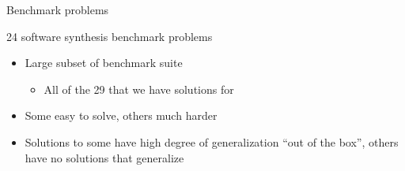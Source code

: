 \documentclass{beamer}
\begin{document}
\begin{frame}{Benchmark problems}

24 software synthesis benchmark problems
\begin{itemize}
	\item Large subset of benchmark suite~\cite{Helmuth:2015:GECCO}
	\begin{itemize}
		\item All of the 29 that we have solutions for
	\end{itemize}
	\item Some easy to solve, others much harder
	\item Solutions to some have high degree of generalization ``out of the box'', others have no solutions that generalize
\end{itemize}


\end{frame}
\end{document}
